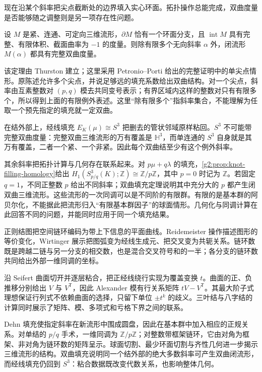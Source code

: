 \ProseParagraphBreak

现在沿某个斜率把尖点截断处的边界填入实心环面。拓扑操作总能完成，双曲度量是否能够随之调整则是另一项存在性问题。

\begin{theorem}\label{g2:thm:hyperbolic-dehn-filling}
	设 \(M\) 是紧、连通、可定向三维流形，\(\partial M\) 恰有一个环面分支，且 \(\operatorname{int}M\) 具有完整、有限体积、截面曲率为 \(-1\) 的度量。则除有限多个无向斜率 \(\alpha\) 外，闭流形 \(M(\alpha)\) 都具有完整双曲度量。
\end{theorem}

该定理由 Thurston 建立；这里采用 Petronio--Porti 给出的完整证明中的单尖点情形\cite[定理0.1，第1项]{PetronioPorti2000}。原陈述允许多个尖点，并说足够远的填充系数给出双曲结构。对一个尖点，斜率由互素整数对 \((p,q)\) 模去共同变号表示；有界区域内这样的整数对只有有限多个，所以得到上面的有限例外表述。这里“除有限多个”指斜率集合，不能理解为任取一个预先指定的填充就一定双曲。

\ProseParagraphBreak

在结外部上，经线填充 \(E_K(\mu)\cong S^3\) 把删去的管状邻域原样粘回。\(S^3\) 不可能带完整双曲度量：完整双曲三维流形的万有覆盖是 \(\mathbb H^3\)，而单连通的 \(S^3\) 自身就是其万有覆盖，二者一个紧、一个非紧。因此每个双曲结至少有这个例外斜率。

\ProseParagraphBreak

其余斜率把拓扑计算与几何存在联系起来。对 \(p\mu+q\lambda\) 的填充，\cref{g2:prop:knot-filling-homology}给出 \(H_1(S^3_{p/q}(K);\mathbb Z)\cong\mathbb Z/p\mathbb Z\)，其中 \(p=0\) 时记为 \(\mathbb Z\)。若固定 \(q=1\)，不同正整数 \(p\) 给出不同斜率；双曲填充定理说明其中充分大的 \(p\) 都产生闭双曲三维流形。这些流形的一次同调可以是不同阶的有限群。有限的是基本群的阿贝尔化，不能据此把流形归入“有限基本群因子”的球面情形。几何化与同调计算在此回答不同的问题，并能同时应用于同一个填充结果。

\begin{chaptersummary}
	正则结图把空间链环编码为带上下信息的平面曲线。Reidemeister 操作描述图形的等价变化，Wirtinger 展示把图弧变为经线生成元、把交叉变为共轭关系。链环数既是跨越二链与另一分支的相交数，也是混合交叉符号和的一半；各分支的链环数共同给出外部一维同调的坐标。

	\ProseParagraphBreak

	沿 Seifert 曲面切开并逐层粘合，把正经线绕行实现为覆盖变换 \(t\)。曲面的正、负推移分别给出 \(V\) 与 \(V^{\mathsf T}\)，因此 Alexander 模有行关系矩阵 \(tV-V^{\mathsf T}\)。其最大阶子式理想保证行列式不依赖曲面的选择，只留下单位 \(\pm t^k\) 的歧义。三叶结与八字结的计算同时展示了矩阵、模、多项式和亏格下界之间的联系。

	\ProseParagraphBreak

	Dehn 填充使指定斜率在新流形中围成圆盘，因此在基本群中加入相应的正规关系。对单结的 \(p/q\) 手术，一维同调为 \(\mathbb Z/p\mathbb Z\)；对整数带框架链环，它由对角为框架、非对角为链环数的矩阵呈示。球面切割、最少环面切割与齐性几何进一步揭示三维流形的结构。双曲填充说明同一个结外部的绝大多数斜率可产生双曲闭流形，而经线填充仍回到 \(S^3\)：粘合数据既改变代数关系，也影响整体几何。
\end{chaptersummary}

